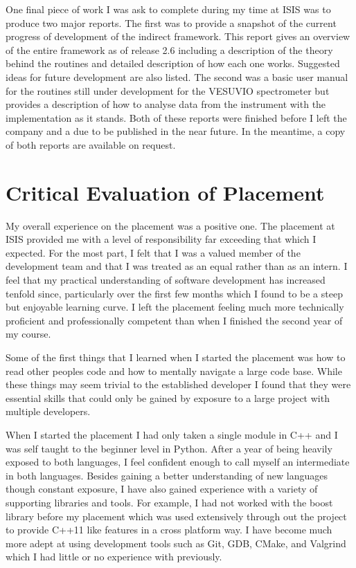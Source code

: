 \documentclass[paper=a4, fontsize=11pt]{scrartcl}	%
\numberwithin{equation}{section}															%
\numberwithin{figure}{section}																%
\numberwithin{table}{section}
\begin{document}
One final piece of work I was ask to complete during my time at ISIS was
to produce two major reports. The first was to provide a snapshot of the
current progress of development of the indirect framework. This report
gives an overview of the entire framework as of release 2.6 including a
description of the theory behind the routines and detailed description
of how each one works. Suggested ideas for future development are also
listed. The second was a basic user manual for the routines still under
development for the VESUVIO spectrometer but provides a description of
how to analyse data from the instrument with the implementation as it
stands. Both of these reports were finished before I left the company
and a due to be published in the near future. In the meantime, a copy of
both reports are available on request.

\section{Critical Evaluation of
Placement}\label{critical-evaluation-of-placement}

My overall experience on the placement was a positive one. The placement
at ISIS provided me with a level of responsibility far exceeding that
which I expected. For the most part, I felt that I was a valued member
of the development team and that I was treated as an equal rather than
as an intern. I feel that my practical understanding of software
development has increased tenfold since, particularly over the first few
months which I found to be a steep but enjoyable learning curve. I left
the placement feeling much more technically proficient and
professionally competent than when I finished the second year of my
course.

Some of the first things that I learned when I started the placement was
how to read other peoples code and how to mentally navigate a large code
base. While these things may seem trivial to the established developer I
found that they were essential skills that could only be gained by
exposure to a large project with multiple developers.

When I started the placement I had only taken a single module in C++ and
I was self taught to the beginner level in Python. After a year of being
heavily exposed to both languages, I feel confident enough to call
myself an intermediate in both languages. Besides gaining a better
understanding of new languages though constant exposure, I have also
gained experience with a variety of supporting libraries and tools. For
example, I had not worked with the boost library before my placement
which was used extensively through out the project to provide C++11 like
features in a cross platform way. I have become much more adept at using
development tools such as Git, GDB, CMake, and Valgrind which I had
little or no experience with previously.
\end{document}
